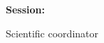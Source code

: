 \begin{titlepage}
    \begin{center}
        \large
        \MakeUppercase{\university}
        
        \LARGE
        \textbf{\MakeUppercase{\faculty}}
        
        \vspace{8cm}
        \huge
        \textbf{\thesistitle}
        
        \vspace{2cm}
        \LARGE
        \textbf{\authornamefl}
        
        \vfill
        \Large
        \textbf{Session:} \session
        
        \vspace{4cm}
        \Large
        Scientific coordinator
        
        \vspace{0.5cm}
        \LARGE
        \textbf{\coordinator}
    \end{center}
\end{titlepage}